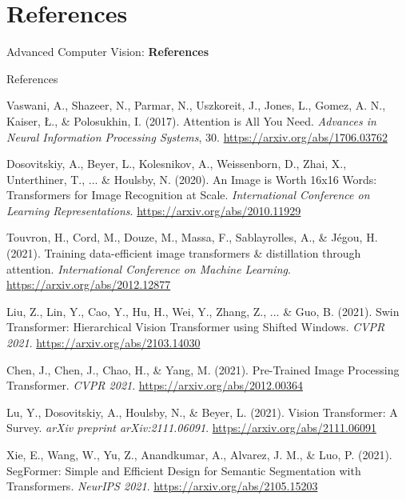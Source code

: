 \section{References}
\begin{frame}{}
    \LARGE Advanced Computer Vision: \textbf{References}
\end{frame}

\begin{frame}[allowframebreaks]{References}
    
    \begin{thebibliography}{99}
        Vaswani, A., Shazeer, N., Parmar, N., Uszkoreit, J., Jones, L., Gomez, A. N., Kaiser, Ł., \& Polosukhin, I. (2017).
        Attention is All You Need.
        \emph{Advances in Neural Information Processing Systems}, 30.
        \url{https://arxiv.org/abs/1706.03762}

        Dosovitskiy, A., Beyer, L., Kolesnikov, A., Weissenborn, D., Zhai, X., Unterthiner, T., ... \& Houlsby, N. (2020).
        An Image is Worth 16x16 Words: Transformers for Image Recognition at Scale.
        \emph{International Conference on Learning Representations}.
        \url{https://arxiv.org/abs/2010.11929}

        Touvron, H., Cord, M., Douze, M., Massa, F., Sablayrolles, A., \& Jégou, H. (2021).
        Training data-efficient image transformers & distillation through attention.
        \emph{International Conference on Machine Learning}.
        \url{https://arxiv.org/abs/2012.12877}

        Liu, Z., Lin, Y., Cao, Y., Hu, H., Wei, Y., Zhang, Z., ... \& Guo, B. (2021).
        Swin Transformer: Hierarchical Vision Transformer using Shifted Windows.
        \emph{CVPR 2021}.
        \url{https://arxiv.org/abs/2103.14030}

        Chen, J., Chen, J., Chao, H., \& Yang, M. (2021).
        Pre-Trained Image Processing Transformer.
        \emph{CVPR 2021}.
        \url{https://arxiv.org/abs/2012.00364}

        Lu, Y., Dosovitskiy, A., Houlsby, N., \& Beyer, L. (2021).
        Vision Transformer: A Survey.
        \emph{arXiv preprint arXiv:2111.06091}.
        \url{https://arxiv.org/abs/2111.06091}

        Xie, E., Wang, W., Yu, Z., Anandkumar, A., Alvarez, J. M., \& Luo, P. (2021).
        SegFormer: Simple and Efficient Design for Semantic Segmentation with Transformers.
        \emph{NeurIPS 2021}.
        \url{https://arxiv.org/abs/2105.15203}


\end{thebibliography}
\end{frame}
